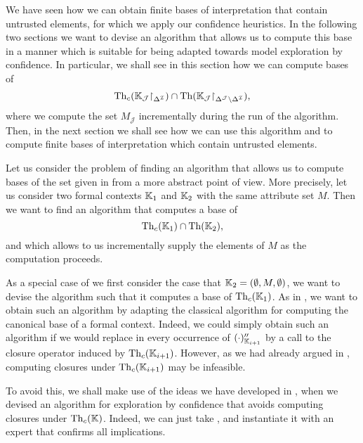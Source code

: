 We have seen how we can obtain finite bases of interpretation that contain untrusted
elements, for which we apply our confidence heuristics.  In the following two sections we
want to devise an algorithm that allows us to compute this base in a manner which is
suitable for being adapted towards model exploration by confidence.  In particular, we
shall see in this section how we can compute bases of
\begin{equation}
  \label{eq:52}
  \operatorname{Th}_{c}({\mathbb{K}}_{\mathcal{J}} \mathord{\upharpoonright}_{\Delta^{\mathcal{I}}}) \cap \operatorname{Th}({\mathbb{K}}_{\mathcal{J}} \mathord{\upharpoonright}_{\Delta^{\mathcal{J}} \setminus \Delta^{\mathcal{I}}}),
\end{equation}
where we compute the set $M_{\mathcal{J}}$ incrementally during the run of the algorithm.
Then, in the next section we shall see how we can use this algorithm and
 to compute finite
bases of interpretation which contain untrusted elements.

Let us consider the problem of finding an algorithm that allows us to compute bases of the
set given in  from a more abstract point of view.  More precisely, let us
consider two formal contexts ${\mathbb{K}}_{1}$ and ${\mathbb{K}}_{2}$ with the same attribute set
$M$.  Then we want to find an algorithm that computes a base of
\begin{equation}
  \label{eq:53}
  \operatorname{Th}_{c}({\mathbb{K}}_{1}) \cap \operatorname{Th}({\mathbb{K}}_{2}),
\end{equation}
and which allows to us incrementally supply the elements of $M$ as the computation
proceeds.

As a special case of  we first consider the case that ${\mathbb{K}}_{2} =
(\emptyset, M, \emptyset)$, \ie we want to devise the algorithm such that it computes a
base of $\operatorname{Th}_{c}({\mathbb{K}}_{1})$.  As in , we want to obtain such an
algorithm by adapting the classical algorithm for computing the canonical base of a formal
context.  Indeed, we could simply obtain such an algorithm if we would replace in
 every occurrence of $(\cdot)_{{\mathbb{K}}_{i+1}}''$
by a call to the closure operator induced by $\operatorname{Th}_{c}({\mathbb{K}}_{i+1})$.  However, as we had
already argued in , computing closures under $\operatorname{Th}_{c}({\mathbb{K}}_{i+1})$
may be infeasible.

To avoid this, we shall make use of the ideas we have developed in
, when we devised an algorithm for exploration by confidence that
avoids computing closures under $\operatorname{Th}_{c}({\mathbb{K}})$.  Indeed, we can just take
, and instantiate it with an
expert that confirms all implications.

